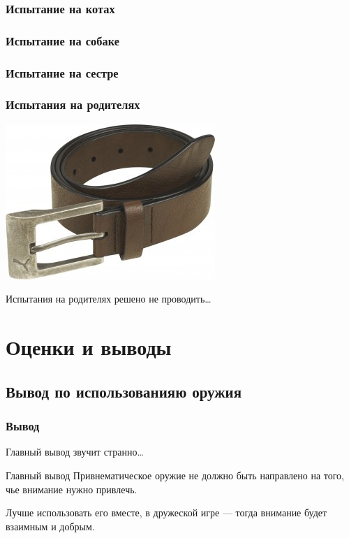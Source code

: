\begin{frame}
    \frametitle{Испытание на котах}
\end{frame}

\begin{frame}
    \frametitle{Испытание на собаке}
\end{frame}

\begin{frame}
    \frametitle{Испытание на сестре}
\end{frame}

\begin{frame}
    \frametitle{Испытания на родителях}
    
    \begin{center}
        \includegraphics[width=.6\textwidth]{fig/belt}
    \end{center}
    
    Испытания на родителях решено не проводить\ldots
\end{frame}


\section{Оценки и выводы}


\subsection{Вывод по использованияю оружия}

\begin{frame}
    \frametitle{Вывод}
    
    Главный вывод звучит странно\ldots 
    
    \begin{block}{Главный вывод}
        Привнематическое оружие \alert{не должно} быть направлено на того, чье внимание нужно привлечь. 
    \end{block}
    
    Лучше использовать его вместе, в дружеской игре --- тогда внимание будет \alert{взаимным} и \alert{добрым}.
\end{frame}


